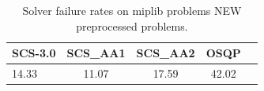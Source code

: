\begin{table}
\centering
\caption{Solver failure rates on miplib problems NEW preprocessed problems.}
\label{t-miplib problems NEW preprocessed-failure}
\begin{tabular}{lcccc}
\toprule
 SCS-3.0 &  SCS\_AA1 &  SCS\_AA2 &  OSQP \\
\midrule
   14.33 &    11.07 &    17.59 & 42.02 \\
\bottomrule
\end{tabular}
\end{table}
